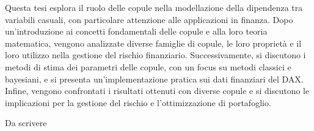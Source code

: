 \documentclass[%
	corpo=11pt,
    twoside,
    stile=classica,
    oldstyle,
    tipotesi=custom,
    greek,
    evenboxes,
]{toptesi}
\begin{document}




\sommario%
Questa tesi esplora il ruolo delle copule nella modellazione della dipendenza tra variabili casuali, con particolare attenzione alle applicazioni in finanza. Dopo un'introduzione ai concetti fondamentali delle copule e alla loro teoria matematica, vengono analizzate diverse famiglie di copule, le loro proprietà e il loro utilizzo nella gestione del rischio finanziario. Successivamente, si discutono i metodi di stima dei parametri delle copule, con un focus su metodi classici e bayesiani, e si presenta un’implementazione pratica sui dati finanziari del DAX. Infine, vengono confrontati i risultati ottenuti con diverse copule e si discutono le implicazioni per la gestione del rischio e l’ottimizzazione di portafoglio.


\ringraziamenti%
Da scrivere


\tablespagetrue\figurespagetrue%

\indici%


    
\end{document}
